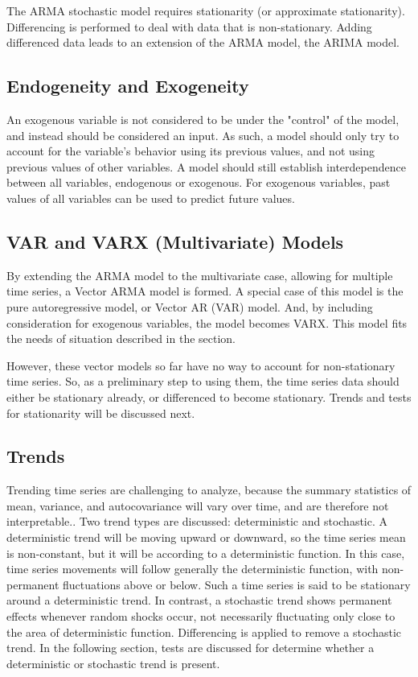 \documentclass[a4paper]{scrartcl}
\begin{document}
The ARMA stochastic model requires stationarity (or approximate stationarity). Differencing is performed to deal with data that is non-stationary. Adding differenced data leads to an extension of the ARMA model, the ARIMA model.

\subsection*{Endogeneity and Exogeneity}
An exogenous variable is not considered to be under the "control" of the model, and instead should be considered an input. As such, a model should only try to account for the variable's behavior using its previous values, and not using previous values of other variables. A model should still establish interdependence between all variables, endogenous or exogenous. For exogenous variables, past values of all variables can be used to predict future values.

\subsection*{VAR and VARX (Multivariate) Models}
By extending the ARMA model to the multivariate case, allowing for multiple time series, a Vector ARMA model is formed. A special case of this model is the pure autoregressive model, or Vector AR (VAR) model. And, by including consideration for exogenous variables, the model becomes VARX. This model fits the needs of situation described in the  section.

However, these vector models so far have no way to account for non-stationary time series. So, as a preliminary step to using them, the time series data should either be stationary already, or differenced to become stationary. Trends and tests for stationarity will be discussed next.

\subsection*{Trends}
Trending time series are challenging to analyze, because the summary statistics of mean, variance, and autocovariance will vary over time, and are therefore not interpretable.\cite{franses1998time}. Two trend types are discussed: deterministic and stochastic. A deterministic trend will be moving upward or downward, so the time series mean is non-constant, but it will be according to a deterministic function. In this case, time series movements will follow generally the deterministic function, with non-permanent fluctuations above or below. Such a time series is said to be stationary around a deterministic trend. In contrast, a stochastic trend shows permanent effects whenever random shocks occur, not necessarily fluctuating only close to the area of deterministic function. Differencing is applied to remove a stochastic trend. In the following section, tests are discussed for determine whether a deterministic or stochastic trend is present.
\end{document}
